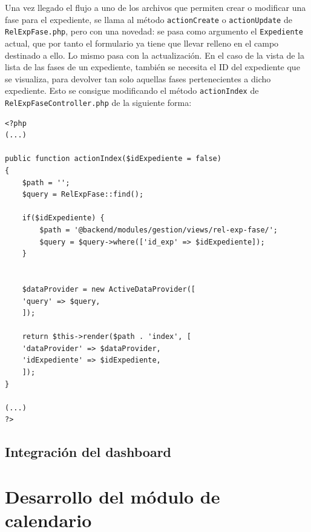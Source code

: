 Una vez llegado el flujo a uno de los archivos que permiten crear o modificar una fase para el expediente, se llama al método \texttt{actionCreate} o \texttt{actionUpdate} de \texttt{RelExpFase.php}, pero con una novedad: se pasa como argumento el \texttt{Expediente} actual, que por tanto el formulario ya tiene que llevar relleno en el campo destinado a ello. Lo mismo pasa con la actualización. En el caso de la vista de la lista de las fases de un expediente, también se necesita el ID del expediente que se visualiza, para devolver tan solo aquellas fases pertenecientes a dicho expediente. Esto se consigue modificando el método \texttt{actionIndex} de \texttt{RelExpFaseController.php} de la siguiente forma:

\begin{verbatim}
<?php
(...)

public function actionIndex($idExpediente = false)
{
	$path = '';
	$query = RelExpFase::find();
	
	if($idExpediente) {
		$path = '@backend/modules/gestion/views/rel-exp-fase/';
		$query = $query->where(['id_exp' => $idExpediente]);
	}
	
	
	$dataProvider = new ActiveDataProvider([
	'query' => $query,
	]);
	
	return $this->render($path . 'index', [
	'dataProvider' => $dataProvider,
	'idExpediente' => $idExpediente,
	]);
}

(...)
?>
\end{verbatim}





\subsection{Integración del dashboard}

\section{Desarrollo del módulo de calendario}
